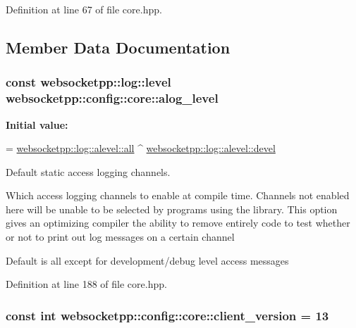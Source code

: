 Definition at line 67 of file core.\+hpp.



\subsection{Member Data Documentation}
\subsubsection[{\texorpdfstring{alog\+\_\+level}{alog\_level}}]{\setlength{\rightskip}{0pt plus 5cm}const websocketpp\+::log\+::level websocketpp\+::config\+::core\+::alog\+\_\+level\hspace{0.3cm}{\ttfamily [static]}}\hypertarget{structwebsocketpp_1_1config_1_1core_abcefa380ef3c250f919ae6a44a9b5724}{}\label{structwebsocketpp_1_1config_1_1core_abcefa380ef3c250f919ae6a44a9b5724}
{\bfseries Initial value\+:}
\begin{DoxyCode}
=
        \hyperlink{structwebsocketpp_1_1log_1_1alevel_a853aa0b8976e53f3181af3bc398d493e}{websocketpp::log::alevel::all} ^ 
      \hyperlink{structwebsocketpp_1_1log_1_1alevel_a65ec21c75999c993c25c72569018f576}{websocketpp::log::alevel::devel}
\end{DoxyCode}


Default static access logging channels. 

Which access logging channels to enable at compile time. Channels not enabled here will be unable to be selected by programs using the library. This option gives an optimizing compiler the ability to remove entirely code to test whether or not to print out log messages on a certain channel

Default is all except for development/debug level access messages 

Definition at line 188 of file core.\+hpp.

\subsubsection[{\texorpdfstring{client\+\_\+version}{client\_version}}]{\setlength{\rightskip}{0pt plus 5cm}const int websocketpp\+::config\+::core\+::client\+\_\+version = 13\hspace{0.3cm}{\ttfamily [static]}}\hypertarget{structwebsocketpp_1_1config_1_1core_af3b087e00d7793c8ae291566f8988375}{}\label{structwebsocketpp_1_1config_1_1core_af3b087e00d7793c8ae291566f8988375}


